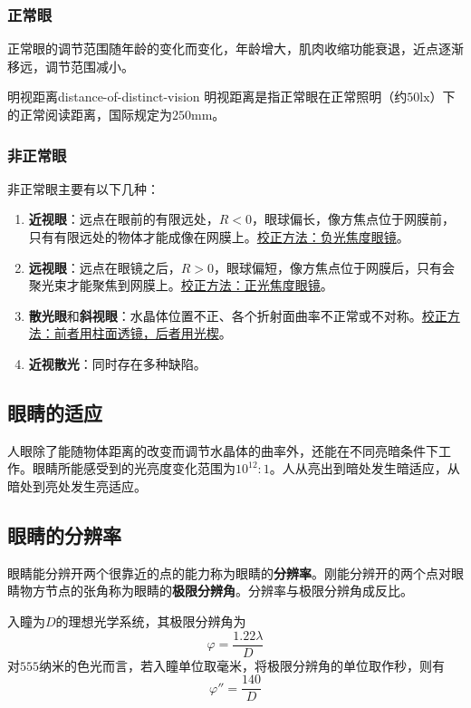 \documentclass[cn,10pt,chinesefont=founder,math=mtpro2,cite=super,toc=onecol,twoside,openany]{elegantbook}
\begin{document}
\subsubsection{正常眼}
正常眼的调节范围随年龄的变化而变化，年龄增大，肌肉收缩功能衰退，近点逐渐移远，调节范围减小。

\begin{definition}{明视距离}{distance-of-distinct-vision}
	明视距离是指正常眼在正常照明（约$50\mathrm{lx}$）下的正常阅读距离，国际规定为$250\mathrm{mm}$。
\end{definition}


\subsubsection{非正常眼}
非正常眼主要有以下几种：
\begin{enumerate}
	\item \textbf{近视眼}：远点在眼前的有限远处，$R<0$，眼球偏长，像方焦点位于网膜前，只有有限远处的物体才能成像在网膜上。\uline{校正方法：负光焦度眼镜}。
	\item \textbf{远视眼}：远点在眼镜之后，$R>0$，眼球偏短，像方焦点位于网膜后，只有会聚光束才能聚焦到网膜上。\uline{校正方法：正光焦度眼镜}。
	\item \textbf{散光眼}和\textbf{斜视眼}：水晶体位置不正、各个折射面曲率不正常或不对称。\uline{校正方法：前者用柱面透镜，后者用光楔}。
	\item \textbf{近视散光}：同时存在多种缺陷。
\end{enumerate}

\subsection{眼睛的适应}
人眼除了能随物体距离的改变而调节水晶体的曲率外，还能在不同亮暗条件下工作。眼睛所能感受到的光亮度变化范围为$10^{12}:1$。人从亮出到暗处发生暗适应，从暗处到亮处发生亮适应。

\subsection{眼睛的分辨率}
眼睛能分辨开两个很靠近的点的能力称为眼睛的\textbf{分辨率}。刚能分辨开的两个点对眼睛物方节点的张角称为眼睛的\textbf{极限分辨角}。分辨率与极限分辨角成反比。

入瞳为$D$的理想光学系统，其极限分辨角为
\begin{equation}
\varphi=\frac{1.22\lambda}{D}
\label{eq:limiting-angle-of-resolution}
\end{equation}
对$555$纳米的色光而言，若入瞳单位取毫米，将极限分辨角的单位取作秒，则有
\begin{equation}
\varphi''=\frac{140}{D}
\end{equation}
\end{document}

